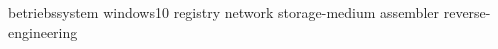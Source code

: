 {betriebssystem}
{windows10}
{registry}
{network}
{storage-medium}
{assembler}
{reverse-engineering}